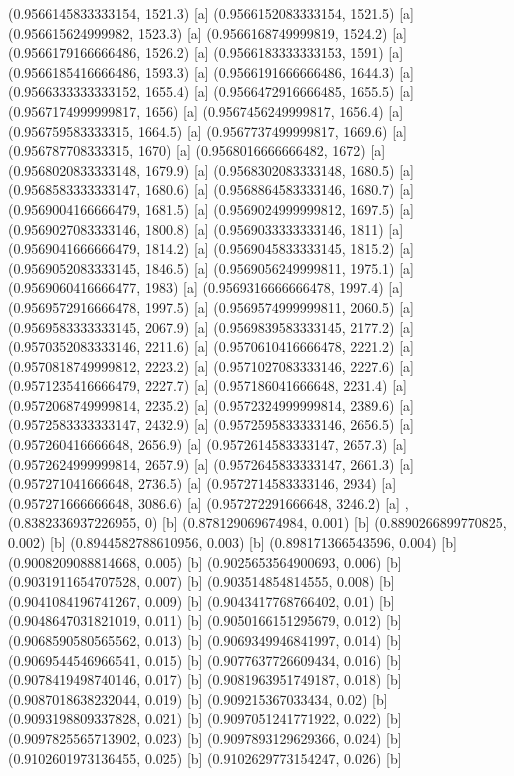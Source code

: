 {{{(0.9566145833333154, 1521.3) [a] 
(0.9566152083333154, 1521.5) [a] 
(0.956615624999982, 1523.3) [a] 
(0.9566168749999819, 1524.2) [a] 
(0.9566179166666486, 1526.2) [a] 
(0.9566183333333153, 1591) [a] 
(0.9566185416666486, 1593.3) [a] 
(0.9566191666666486, 1644.3) [a] 
(0.9566333333333152, 1655.4) [a] 
(0.9566472916666485, 1655.5) [a] 
(0.9567174999999817, 1656) [a] 
(0.9567456249999817, 1656.4) [a] 
(0.956759583333315, 1664.5) [a] 
(0.9567737499999817, 1669.6) [a] 
(0.956787708333315, 1670) [a] 
(0.9568016666666482, 1672) [a] 
(0.9568020833333148, 1679.9) [a] 
(0.9568302083333148, 1680.5) [a] 
(0.9568583333333147, 1680.6) [a] 
(0.9568864583333146, 1680.7) [a] 
(0.9569004166666479, 1681.5) [a] 
(0.9569024999999812, 1697.5) [a] 
(0.9569027083333146, 1800.8) [a] 
(0.9569033333333146, 1811) [a] 
(0.9569041666666479, 1814.2) [a] 
(0.9569045833333145, 1815.2) [a] 
(0.9569052083333145, 1846.5) [a] 
(0.9569056249999811, 1975.1) [a] 
(0.9569060416666477, 1983) [a] 
(0.9569316666666478, 1997.4) [a] 
(0.9569572916666478, 1997.5) [a] 
(0.9569574999999811, 2060.5) [a] 
(0.9569583333333145, 2067.9) [a] 
(0.9569839583333145, 2177.2) [a] 
(0.9570352083333146, 2211.6) [a] 
(0.9570610416666478, 2221.2) [a] 
(0.9570818749999812, 2223.2) [a] 
(0.9571027083333146, 2227.6) [a] 
(0.9571235416666479, 2227.7) [a] 
(0.957186041666648, 2231.4) [a] 
(0.9572068749999814, 2235.2) [a] 
(0.9572324999999814, 2389.6) [a] 
(0.9572583333333147, 2432.9) [a] 
(0.9572595833333146, 2656.5) [a] 
(0.957260416666648, 2656.9) [a] 
(0.9572614583333147, 2657.3) [a] 
(0.9572624999999814, 2657.9) [a] 
(0.9572645833333147, 2661.3) [a] 
(0.957271041666648, 2736.5) [a] 
(0.9572714583333146, 2934) [a] 
(0.957271666666648, 3086.6) [a] 
(0.957272291666648, 3246.2) [a] 
},{(0.8382336937226955, 0) [b] 
(0.878129069674984, 0.001) [b] 
(0.8890266899770825, 0.002) [b] 
(0.8944582788610956, 0.003) [b] 
(0.898171366543596, 0.004) [b] 
(0.9008209088814668, 0.005) [b] 
(0.9025653564900693, 0.006) [b] 
(0.9031911654707528, 0.007) [b] 
(0.903514854814555, 0.008) [b] 
(0.9041084196741267, 0.009) [b] 
(0.9043417768766402, 0.01) [b] 
(0.9048647031821019, 0.011) [b] 
(0.9050166151295679, 0.012) [b] 
(0.9068590580565562, 0.013) [b] 
(0.9069349946841997, 0.014) [b] 
(0.9069544546966541, 0.015) [b] 
(0.9077637726609434, 0.016) [b] 
(0.9078419498740146, 0.017) [b] 
(0.9081963951749187, 0.018) [b] 
(0.9087018638232044, 0.019) [b] 
(0.909215367033434, 0.02) [b] 
(0.9093198809337828, 0.021) [b] 
(0.9097051241771922, 0.022) [b] 
(0.9097825565713902, 0.023) [b] 
(0.9097893129629366, 0.024) [b] 
(0.9102601973136455, 0.025) [b] 
(0.9102629773154247, 0.026) [b] 
}}}
